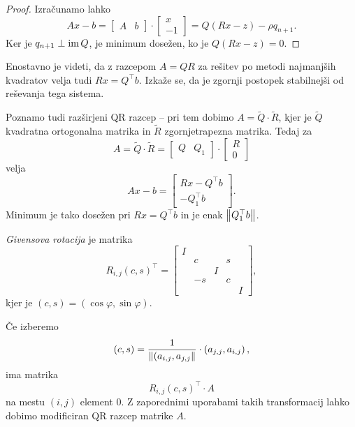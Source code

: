 \begin{proof}
Izračunamo lahko
\[
Ax - b =
\begin{bmatrix}
A & b
\end{bmatrix}
\cdot
\begin{bmatrix}
x \\ -1
\end{bmatrix}
=
Q(Rx - z) - \rho q_{n+1}.
\]
Ker je $q_{n+1} \perp \operatorname{im} Q$, je minimum dosežen, ko je
$Q(Rx - z) = 0$.
\end{proof}

\begin{opomba}
Enostavno je videti, da z razcepom $A = QR$ za rešitev po metodi
najmanjših kvadratov velja tudi $Rx = Q^\top b$. Izkaže se, da je
zgornji postopek stabilnejši od reševanja tega sistema.
\end{opomba}

\begin{opomba}
Poznamo tudi razširjeni QR razcep -- pri tem dobimo
$A = \widetilde{Q} \cdot \widetilde{R}$, kjer je $\widetilde{Q}$
kvadratna ortogonalna matrika in $\widetilde{R}$ zgornjetrapezna
matrika. Tedaj za
\[
A =
\widetilde{Q} \cdot \widetilde{R} =
\begin{bmatrix}
Q & Q_1
\end{bmatrix}
\cdot
\begin{bmatrix}
R \\ 0
\end{bmatrix}
\]
velja
\[
Ax - b =
\begin{bmatrix}
Rx - Q^\top b \\ -Q_1^\top b
\end{bmatrix}.
\]
Minimum je tako dosežen pri $Rx = Q^\top b$ in je enak
$\left\lVert Q_1^\top b\right\rVert$.
\end{opomba}

\begin{definicija}
\emph{Givensova rotacija} je
matrika
\[
R_{i,j}(c,s)^\top =
\begin{bmatrix}
I &    &   &   &   \\
  &  c &   & s &   \\
  &    & I &   &   \\
  & -s &   & c &   \\
  &    &   &   & I
\end{bmatrix},
\]
kjer je $(c, s) = (\cos \varphi, \sin \varphi)$.
\end{definicija}

\begin{opomba}
Če izberemo
\[
(c,s) =
\frac{1}{\left\lVert (a_{i,j}, a_{j,j}\right\rVert} \cdot \left(a_{j,j}, a_{i,j}\right),
\]
ima matrika
\[
R_{i,j}(c,s)^\top \cdot A
\]
na mestu $(i,j)$ element $0$. Z zaporednimi uporabami takih
transformacij lahko dobimo modificiran QR razcep matrike $A$.
\end{opomba}

